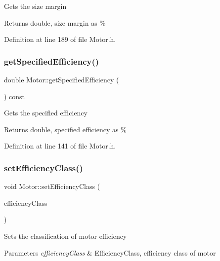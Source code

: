 Gets the size margin \begin{DoxyReturn}{Returns}
double, size margin as \% 
\end{DoxyReturn}


Definition at line 189 of file Motor.\+h.

\mbox{\label{class_motor_aca202d3c2061bd8c19e1819331033e36}} 
\subsubsection{\texorpdfstring{get\+Specified\+Efficiency()}{getSpecifiedEfficiency()}}
{\footnotesize\ttfamily double Motor\+::get\+Specified\+Efficiency (\begin{DoxyParamCaption}{ }\end{DoxyParamCaption}) const\hspace{0.3cm}{\ttfamily [inline]}}

Gets the specified efficiency \begin{DoxyReturn}{Returns}
double, specified efficiency as \% 
\end{DoxyReturn}


Definition at line 141 of file Motor.\+h.

\mbox{\label{class_motor_afa82df266d74ccfed49bf592b5b6526f}} 
\subsubsection{\texorpdfstring{set\+Efficiency\+Class()}{setEfficiencyClass()}}
{\footnotesize\ttfamily void Motor\+::set\+Efficiency\+Class (\begin{DoxyParamCaption}\item[{Efficiency\+Class}]{efficiency\+Class }\end{DoxyParamCaption})\hspace{0.3cm}{\ttfamily [inline]}}

Sets the classification of motor efficiency 
\begin{DoxyParams}{Parameters}
{\em efficiency\+Class} & Efficiency\+Class, efficiency class of motor \\
\hline
\end{DoxyParams}


